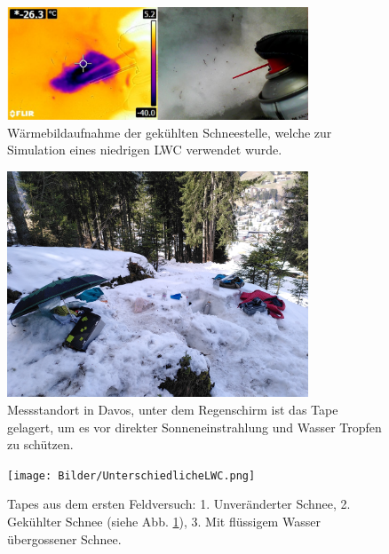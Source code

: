\begin{figure}[H]
    \centering
    \includegraphics[width=0.8\textwidth]{Bilder/KalterSchnee.png}
    \caption{Wärmebildaufnahme der gekühlten Schneestelle, welche zur Simulation eines niedrigen LWC verwendet wurde.} 
    \label{fig:KaltSchnee}
\end{figure}



\begin{figure}[H]
    \centering
    \includegraphics[width=0.8\textwidth]{Bilder/IMG_20240411_124421.jpg}
    \caption{Messstandort in Davos, unter dem Regenschirm ist das Tape gelagert, um es vor direkter Sonneneinstrahlung und Wasser Tropfen zu schützen.} 
    \label{fig:DavosMessung}
\end{figure}

\begin{figure}[H]
    \centering
    \texttt{[image: Bilder/UnterschiedlicheLWC.png]}
    \caption{Tapes aus dem ersten Feldversuch: 1. Unveränderter Schnee, 2. Gekühlter Schnee (siehe Abb. \ref{fig:KaltSchnee}),  3. Mit flüssigem Wasser übergossener Schnee.} 
    \label{fig:DavosMessungErg}
\end{figure}


\newpage


\label{drittFeldVer}


